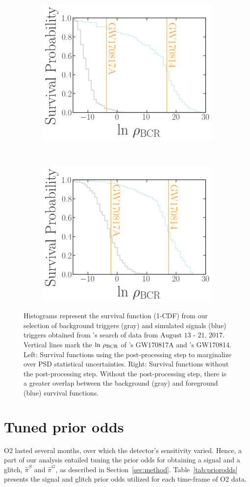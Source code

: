 \documentclass[
 nofootinbib,
 amsmath,amssymb,
 aps,
 twocolumn,
 superscriptaddress
]{revtex4-2}
\newcommand{\pycbc}{{\sc {{PyCBC}}}\xspace}
\newcommand{\GWTC}{{\sc {{GWTC-1}}}\xspace}
\newcommand{\IAS}{{\sc {{IAS}}}\xspace}
\newcommand{\mathcmd}[1]{{\sc \relax\ifmmode#1\else $#1$\fi}\xspace}
\newcommand{\bcr}{\mathcmd{\rho_\text{BCR}}}
\begin{document}
\begin{figure}
    \centering
    \begin{subfigure}
        \centering
        \includegraphics[width=0.45\linewidth]{reweighted_bcr_cdf_smaller_legend.png}
    \end{subfigure}
    ~ 
    \begin{subfigure}
        \centering
        \includegraphics[width=0.45\linewidth]{orig_bcr_cdf_smaller_legend.png}
    \end{subfigure}
    \caption{
    Histograms represent the survival function (1-CDF) from our selection of background triggers (gray) and simulated signals (blue) triggers obtained from \pycbc's search of data from $\text{August 13 - 21, 2017}$. Vertical lines mark the $\text{ln}\ \bcr$ of \IAS's GW170817A and \GWTC's GW170814.
    Left: Survival functions using the post-processing step to marginalize over PSD statistical uncertainties. Right: Survival functions without the post-processing step. Without the post-processing step, there is a greater overlap between the background (gray) and foreground (blue) survival functions.
    \label{fig:bcrCdf}}
\end{figure}






\section{Tuned prior odds}\label{apdx:alphabeta}

O2 lasted several months, over which the detector's sensitivity varied. Hence, a part of our analysis entailed tuning the prior odds for obtaining a signal and a glitch, $\hat{\pi}^S$ and $\hat{\pi}^G$, as described in Section~\ref{sec:method}. Table~\ref{tab:priorodds} presents the signal and glitch prior odds utilized for each time-frame of O2 data. 

\end{document}
